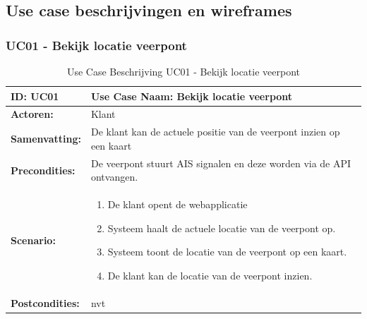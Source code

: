 \documentclass{article}
\begin{document}
\subsection{Use case beschrijvingen en wireframes}
\subsubsection{UC01 - Bekijk locatie veerpont}
\begin{table}[H]
    \centering
    \begin{tabularx}{\textwidth}{|l|X|}
        \hline
        \textbf{ID:} UC01 & \textbf{Use Case Naam:} Bekijk locatie veerpont  \\
        \hline
        \textbf{Actoren:} & Klant \\
        \hline
        \textbf{Samenvatting:}  & De klant kan de actuele positie van de veerpont inzien op een kaart \\
        \hline 
        \textbf{Precondities:} & De veerpont stuurt AIS signalen en deze worden via de API ontvangen. \\
        \hline
        \textbf{Scenario:} & \begin{enumerate}
            \item De klant opent de webapplicatie
            \item Systeem haalt de actuele locatie van de veerpont op.
            \item Systeem toont de locatie van de veerpont op een kaart.
            \item De klant kan de locatie van de veerpont inzien.
        \end{enumerate} \\
        \hline 
        \textbf{Postcondities:} & nvt \\ 
        \hline

    \end{tabularx}
    \caption{Use Case Beschrijving UC01 - Bekijk locatie veerpont}
\end{table}
\end{document}
